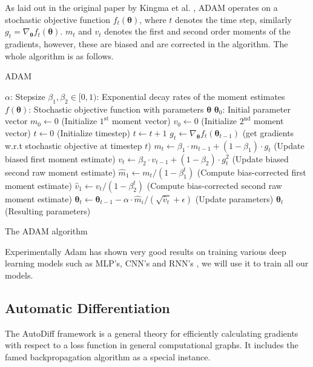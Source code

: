 As laid out in the original paper by Kingma et al. \cite{kingma_adam:_2014}, ADAM operates on a
stochastic objective function $f_t(\bm{\theta})$, where $t$ denotes the time
step, similarly $g_t = \nabla_{\bm{\theta}}f_t(\bm{\theta})$. $m_t$ and $v_t$ denotes the first and second order moments of
the gradients, however, these are biased and are corrected in the algorithm.
The whole algorithm is as follows.
\begin{algorithm}[H]
  \caption{ADAM}\label{ADAM}
  \begin{algorithmic}[1]
    \Require $\alpha$: Stepsize
    \Require $\beta_1, \beta_2 \in [0, 1)$: Exponential decay rates of the moment estimates
    \Require $f(\bm{\theta})$: Stochastic objective function with parameters
    $\bm{\theta}$
    \Require $\bm{\theta}_0$: Initial parameter vector
    \State $m_0 \gets 0$ (Initialize $1^{\text{st}}$ moment vector)
    \State $v_0 \gets 0$ (Initialize $2^{\text{nd}}$ moment vector)
    \State $t \gets 0$ (Initialize timestep)
    \State $t \gets t + 1$
    \State $g_t \gets \nabla_{\bm{\theta}}f_t(\bm{\theta}_{t-1})$ (get gradients w.r.t stochastic objective at timestep $t$)
    \State $m_t \gets \beta_1 \cdot m_{t-1} + (1 - \beta_1) \cdot g_t$ (Update biased first moment estimate)
    \State $v_t \gets \beta_2 \cdot v_{t-1} + (1 - \beta_2) \cdot g^2_t$ (Update biased second raw moment estimate)
    \State $\hat{m}_1 \gets m_t / (1 - \beta^t_1)$ (Compute bias-corrected first moment estimate)
    \State $\hat{v}_1 \gets v_t / (1 - \beta^t_2)$ (Compute bias-corrected second raw moment estimate)
    \State $\bm{\theta}_t \gets \bm{\theta}_{t-1} - \alpha \cdot \hat{m}_i/(\sqrt{\hat{v}_t} + \epsilon)$ (Update parameters)
    \EndWhile
    \Return $\bm{\theta}_t$ (Resulting parameters)
  \end{algorithmic}
  \caption{The ADAM algorithm}
\end{algorithm}

Experimentally Adam has shown very good results on training various deep
learning models such as MLP's, CNN's and RNN's \cite{kingma_adam:_2014}, we will
use it to train all our models.

\subsection{Automatic Differentiation}
\label{ch:autodiff}
The AutoDiff framework is a general theory for efficiently
calculating gradients with respect to a loss function in general computational graphs.
It includes the famed backpropagation \cite{Bishop:2006,
  Rumelhart:1986:LIR:104279.104293} algorithm as a special instance.

